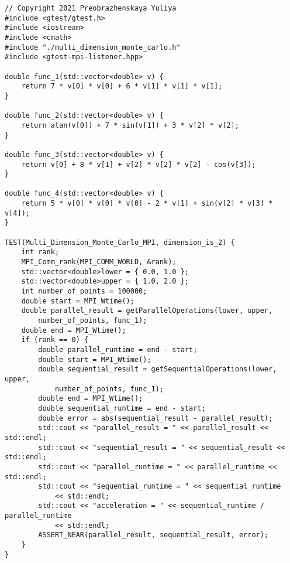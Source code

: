 \documentclass{report}
\begin{document}
\begin{lstlisting}
// Copyright 2021 Preobrazhenskaya Yuliya
#include <gtest/gtest.h>
#include <iostream>
#include <cmath>
#include "./multi_dimension_monte_carlo.h"
#include <gtest-mpi-listener.hpp>

double func_1(std::vector<double> v) {
    return 7 * v[0] * v[0] + 6 * v[1] * v[1] * v[1];
}

double func_2(std::vector<double> v) {
    return atan(v[0]) + 7 * sin(v[1]) + 3 * v[2] * v[2];
}

double func_3(std::vector<double> v) {
    return v[0] + 8 * v[1] + v[2] * v[2] * v[2] - cos(v[3]);
}

double func_4(std::vector<double> v) {
    return 5 * v[0] * v[0] * v[0] - 2 * v[1] + sin(v[2] * v[3] * v[4]);
}

TEST(Multi_Dimension_Monte_Carlo_MPI, dimension_is_2) {
    int rank;
    MPI_Comm_rank(MPI_COMM_WORLD, &rank);
    std::vector<double>lower = { 0.0, 1.0 };
    std::vector<double>upper = { 1.0, 2.0 };
    int number_of_points = 100000;
    double start = MPI_Wtime();
    double parallel_result = getParallelOperations(lower, upper,
        number_of_points, func_1);
    double end = MPI_Wtime();
    if (rank == 0) {
        double parallel_runtime = end - start;
        double start = MPI_Wtime();
        double sequential_result = getSequentialOperations(lower, upper,
            number_of_points, func_1);
        double end = MPI_Wtime();
        double sequential_runtime = end - start;
        double error = abs(sequential_result - parallel_result);
        std::cout << "parallel_result = " << parallel_result << std::endl;
        std::cout << "sequential_result = " << sequential_result << std::endl;
        std::cout << "parallel_runtime = " << parallel_runtime << std::endl;
        std::cout << "sequential_runtime = " << sequential_runtime
            << std::endl;
        std::cout << "acceleration = " << sequential_runtime / parallel_runtime
            << std::endl;
        ASSERT_NEAR(parallel_result, sequential_result, error);
    }
}


\end{lstlisting}
\end{document}

